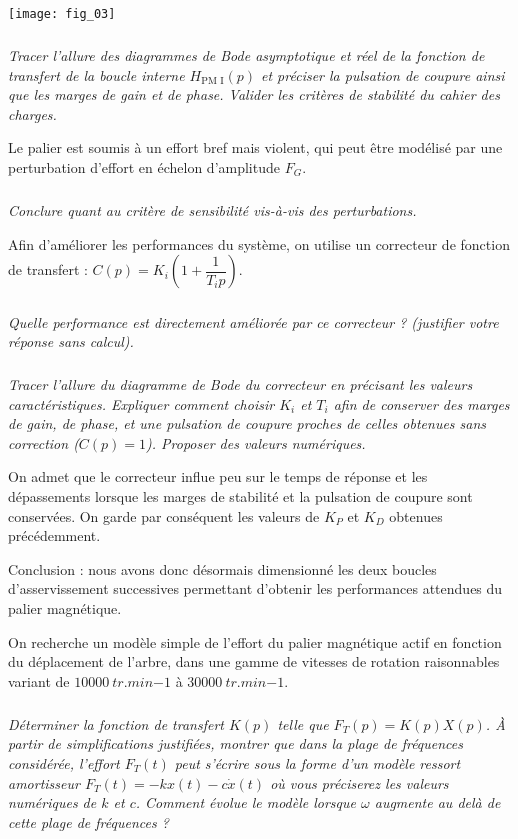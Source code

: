 \begin{center}
\texttt{[image: fig\_03]}
\end{center}


\subparagraph{}\textit{Tracer l'allure des diagrammes de Bode asymptotique et réel de la fonction
de transfert de la boucle interne $H_{\text{PM I}}(p)$ et préciser la pulsation de coupure ainsi que les marges de gain et de phase. Valider les critères de stabilité du cahier des charges.}

Le palier est soumis à un effort bref mais violent, qui peut être modélisé par une perturbation d'effort en
échelon d'amplitude $F_G$.

\subparagraph{}\textit{Conclure quant au critère de sensibilité vis-à-vis des perturbations.}

Afin d'améliorer les performances du système, on utilise un correcteur de fonction
de transfert : $C(p)=K_i\left(1+\dfrac{1}{T_i p} \right)$.

\subparagraph{}\textit{Quelle performance est directement améliorée par ce correcteur ? (justifier
votre réponse sans calcul).}


\subparagraph{}\textit{Tracer l'allure du diagramme de Bode du correcteur en précisant les
valeurs caractéristiques. Expliquer comment choisir $K_i$ et $T_i$ afin de conserver
des marges de gain, de phase, et une pulsation de coupure proches de celles obtenues
sans correction ($C(p)=1$). Proposer des valeurs numériques.}


On admet que le correcteur influe peu sur le temps de réponse et les dépassements
lorsque les marges de stabilité et la pulsation de coupure sont conservées.
On garde par conséquent les valeurs de $K_P$ et $K_D$ obtenues précédemment.

Conclusion : nous avons donc désormais dimensionné les deux boucles d'asservissement
successives permettant d'obtenir les performances attendues du palier
magnétique.

On recherche un modèle simple de l'effort du palier magnétique actif en fonction du
déplacement de l'arbre, dans une gamme de vitesses de rotation raisonnables
variant de $\SI{10000}{tr.min{-1}}$ à $\SI{30000}{tr.min{-1}}$.

\subparagraph{}\textit{Déterminer la fonction de transfert $K(p)$ telle que $F_T(p)=K(p)X(p)$.
À partir de simplifications justifiées, montrer que dans la plage de fréquences
considérée, l'effort $F_T(t)$ peut s'écrire sous la forme d'un modèle ressort amortisseur
$F_T(t)=-kx(t)-c\dot{x}(t)$ où vous préciserez les valeurs numériques de $k$ et $c$. Comment évolue le modèle lorsque
$\omega$ augmente au delà de cette plage de fréquences ?}



